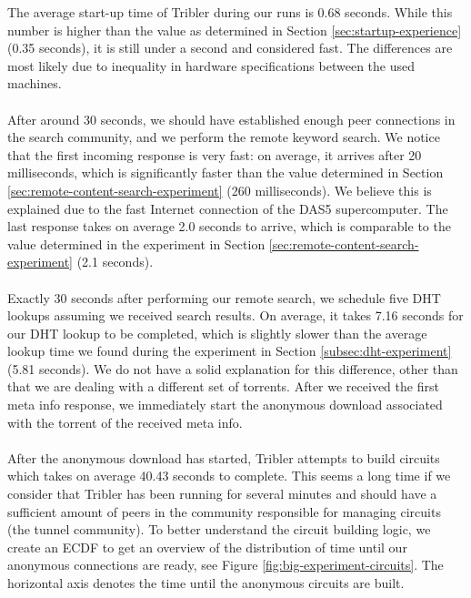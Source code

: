 The average start-up time of Tribler during our runs is 0.68 seconds. While this number is higher than the value as determined in Section \ref{sec:startup-experience} (0.35 seconds), it is still under a second and considered fast. The differences are most likely due to inequality in hardware specifications between the used machines.\\\\
After around 30 seconds, we should have established enough peer connections in the search community, and we perform the remote keyword search. We notice that the first incoming response is very fast: on average, it arrives after 20 milliseconds, which is significantly faster than the value determined in Section \ref{sec:remote-content-search-experiment} (260 milliseconds). We believe this is explained due to the fast Internet connection of the DAS5 supercomputer. The last response takes on average 2.0 seconds to arrive, which is comparable to the value determined in the experiment in Section \ref{sec:remote-content-search-experiment} (2.1 seconds).\\\\
Exactly 30 seconds after performing our remote search, we schedule five DHT lookups assuming we received search results. On average, it takes 7.16 seconds for our DHT lookup to be completed, which is slightly slower than the average lookup time we found during the experiment in Section \ref{subsec:dht-experiment} (5.81 seconds). We do not have a solid explanation for this difference, other than that we are dealing with a different set of torrents. After we received the first meta info response, we immediately start the anonymous download associated with the torrent of the received meta info.\\\\
After the anonymous download has started, Tribler attempts to build circuits which takes on average 40.43 seconds to complete. This seems a long time if we consider that Tribler has been running for several minutes and should have a sufficient amount of peers in the community responsible for managing circuits (the tunnel community). To better understand the circuit building logic, we create an ECDF to get an overview of the distribution of time until our anonymous connections are ready, see Figure \ref{fig:big-experiment-circuits}. The horizontal axis denotes the time until the anonymous circuits are built.\\

